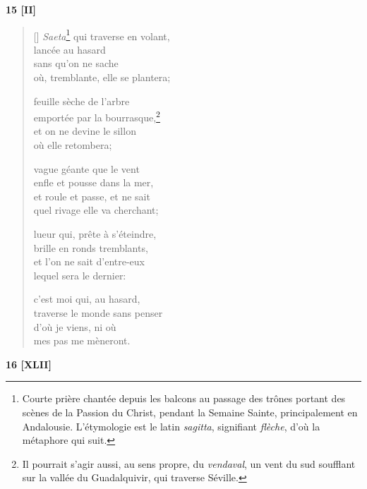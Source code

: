 \documentclass[a4paper,12pt]{book}
\begin{document}
\bigskip

\begin{center}
  \textbf{15 [II]}
\end{center}

\settowidth{\versewidth}{où, tremblante, elle se plantera;}

\begin{verse}[\versewidth]
  \emph{Saeta}\footnote{Courte prière chantée
  depuis les balcons au passage des trônes portant des scènes de la
  Passion du Christ, pendant la Semaine Sainte, principalement en
  Andalousie. L'étymologie est le latin \emph{sagitta},
  signifiant \emph{flèche}, d'où la métaphore qui suit.} qui traverse en volant, \\
  lancée au hasard \\
  sans qu'on ne sache \\
  où, tremblante, elle se plantera;

  feuille sèche de l'arbre \\
  emportée par la bourrasque,\footnote{Il pourrait s'agir aussi, au
  sens propre, du \emph{vendaval}, un vent du sud soufflant sur la
  vallée du Guadalquivir, qui traverse Séville.} \\
  et on ne devine le sillon \\
  où elle retombera;

  vague géante que le vent \\
  enfle et pousse dans la mer, \\
  et roule et passe, et ne sait \\
  quel rivage elle va cherchant;

  lueur qui, prête à s'éteindre, \\
  brille en ronds tremblants, \\
  et l'on ne sait d'entre-eux \\
  lequel sera le dernier:

  c'est moi qui, au hasard, \\
  traverse le monde sans penser \\
  d'où je viens, ni où \\
  mes pas me mèneront.
\end{verse}

\bigskip

\begin{center}
  \textbf{16 [XLII]}
\end{center}
\end{document}
